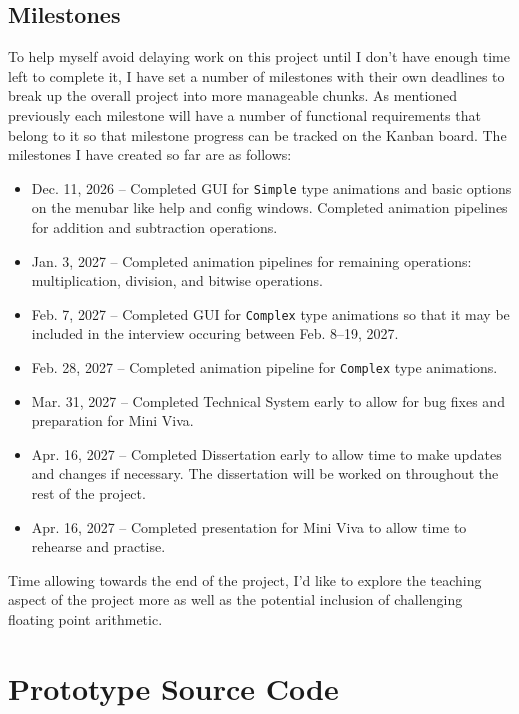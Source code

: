 \documentclass{report}
\begin{document}
\section{Milestones}
To help myself avoid delaying work on this project until I don't have enough
time left to complete it, I have set a number of milestones with their own
deadlines to break up the overall project into more manageable chunks. As
mentioned previously each milestone will have a number of functional
requirements that belong to it so that milestone progress can be tracked on the
Kanban board. The milestones I have created so far are as follows:

\begin{itemize}
	\item Dec. 11, 2026 -- Completed GUI for \texttt{Simple} type animations
	and basic options on the menubar like help and config windows. Completed
	animation pipelines for addition and subtraction operations.
	\item Jan. 3, 2027 -- Completed animation pipelines for remaining
	operations: multiplication, division, and bitwise operations.
	\item Feb. 7, 2027 -- Completed GUI for \texttt{Complex} type animations so
	that it may be included in the interview occuring between Feb. 8--19, 2027.
	\item Feb. 28, 2027 -- Completed animation pipeline for \texttt{Complex}
	type animations.
	\item Mar. 31, 2027 -- Completed Technical System early to allow for bug
	fixes and preparation for Mini Viva.
	\item Apr. 16, 2027 -- Completed Dissertation early to allow time to make
	updates and changes if necessary. The dissertation will be worked on
	throughout the rest of the project.
	\item Apr. 16, 2027 -- Completed presentation for Mini Viva to allow time
	to rehearse and practise.
\end{itemize}

Time allowing towards the end of the project, I'd like to explore the teaching
aspect of the project more as well as the potential inclusion of challenging
floating point arithmetic.




\appendix
\chapter{Prototype Source Code}
\label{proto_source}
\end{document}
